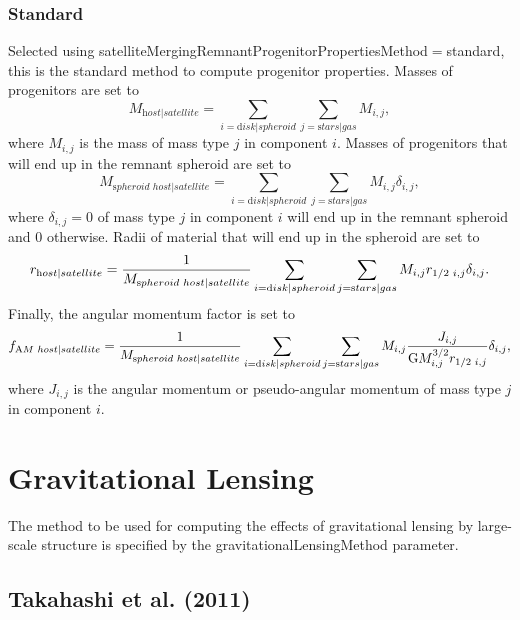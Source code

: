 \subsubsection{Standard}

Selected using {\normalfont \ttfamily satelliteMergingRemnantProgenitorPropertiesMethod}$=${\normalfont \ttfamily standard}, this is the standard method to compute progenitor properties. Masses of progenitors are set to
\begin{equation}
 M_{\mathrm host|satellite} = \sum_{i={\mathrm disk|spheroid}} \sum_{j={\mathrm stars|gas}} M_{i,j},
\end{equation}
where $M_{i,j}$ is the mass of mass type $j$ in \gls{component} $i$. Masses of progenitors that will end up in the remnant spheroid are set to
\begin{equation}
 M_{\mathrm spheroid\,\,host|satellite} = \sum_{i={\mathrm disk|spheroid}} \sum_{j={\mathrm stars|gas}} M_{i,j} \delta_{i,j},
\end{equation}
where $\delta_{i,j}=0$ of mass type $j$ in \gls{component} $i$ will end up in the remnant spheroid and $0$ otherwise. Radii of material that will end up in the spheroid are set to
\begin{equation}
 r_{\mathrm host|satellite} = {1 \over M_{\mathrm spheroid\,\,host|satellite}} \sum_{i={\mathrm disk|spheroid}} \sum_{j={\mathrm stars|gas}} M_{i,j} r_{1/2\,\,i,j} \delta_{i,j}.
\end{equation}
Finally, the angular momentum factor is set to
\begin{equation}
 f_{\mathrm AM\,\,host|satellite} = {1 \over M_{\mathrm spheroid\,\,host|satellite}} \sum_{i={\mathrm disk|spheroid}} \sum_{j={\mathrm stars|gas}} M_{i,j} {J_{i,j} \over {\mathrm G} M^{3/2}_{i,j} r_{1/2\,\,i,j}} \delta_{i,j},
\end{equation}
where $J_{i,j}$ is the angular momentum or pseudo-angular momentum of mass type $j$ in \gls{component} $i$.

\section{Gravitational Lensing}\label{phys:gravitationalLensing}

The method to be used for computing the effects of gravitational lensing by large-scale structure is specified by the {\normalfont \ttfamily gravitationalLensingMethod} parameter.

\subsection{Takahashi et al. (2011)}\label{phys:gravitationalLensing:gravitationalLensingTakahashi2011}

